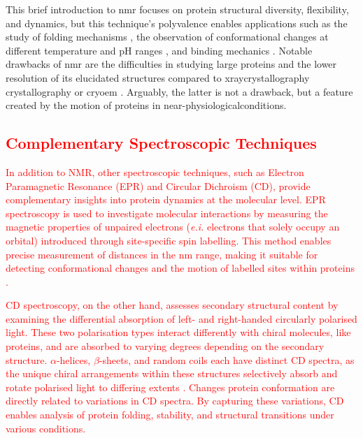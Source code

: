 This brief introduction to \gls{nmr} focuses on protein structural diversity, \gls{flexibility}, and \gls{dynamics}, but this technique's polyvalence enables applications such as the study of folding mechanisms \cite{peacock_hydrogendeuterium_2021}, the observation of conformational changes at different temperature and pH ranges \cite{gerken_measurement_2011}, and binding mechanics \cite{dubey_role_2020}. Notable drawbacks of \gls{nmr} are the difficulties in studying large proteins \cite{frueh_nmr_2013} and the lower resolution of its elucidated structures compared to \gls{xraycrystallography} crystallography or \gls{cryoem} \cite{kwan_macromolecular_2011}. Arguably, the latter is not a drawback, but a feature created by the motion of proteins in near-\gls{physiologicalconditions}.

\subsection{\textcolor{red}{Complementary Spectroscopic Techniques}}

\textcolor{red}{In addition to NMR, other spectroscopic techniques, such as Electron Paramagnetic Resonance (EPR) and Circular Dichroism (CD), provide complementary insights into protein dynamics at the molecular level. EPR spectroscopy is used to investigate molecular interactions by measuring the magnetic properties of unpaired electrons (\textit{e.i.} electrons that solely occupy an orbital) introduced through site-specific spin labelling. This method enables precise measurement of distances in the nm range, making it suitable for detecting conformational changes and the motion of labelled sites within proteins \cite{sahu_electron_2020}.}

\textcolor{red}{CD spectroscopy, on the other hand, assesses secondary structural content by examining the differential absorption of left- and right-handed circularly polarised light. These two polarisation types interact differently with chiral molecules, like proteins, and are absorbed to varying degrees depending on the secondary structure. $\alpha$-helices, $\beta$-sheets, and random coils each have distinct CD spectra, as the unique chiral arrangements within these structures selectively absorb and rotate polarised light to differing extents \cite{greenfield_using_2006}. Changes protein conformation are directly related to variations in CD spectra. By capturing these variations, CD enables analysis of protein folding, stability, and structural transitions under various conditions.}

